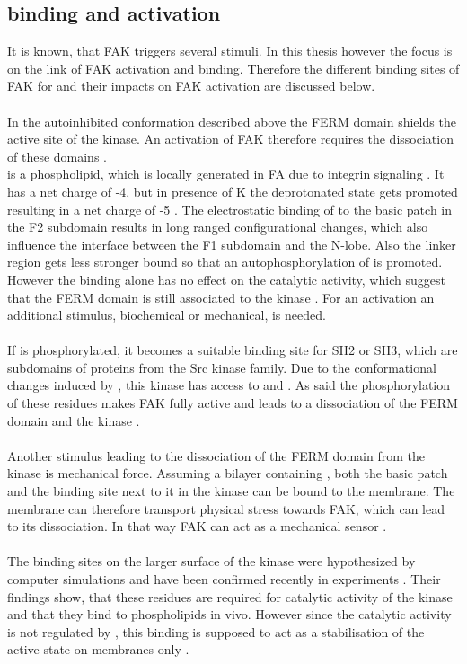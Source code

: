 \subsection{\pip{} binding and activation}
It is known, that FAK triggers several stimuli. In this thesis however the focus is on the link of FAK activation and \pip{} binding. Therefore the different binding sites of FAK for \pip{} and their impacts on FAK activation are discussed below.\\
\\
In the autoinhibited conformation described above the FERM domain shields the active site of the kinase. An activation of FAK therefore requires the dissociation of these domains \autocite{structFAK}.\\
\pip{} is a phospholipid, which is locally generated in FA due to integrin signaling \autocite{CITATION34}. It has a net charge of -4, but in presence of K the deprotonated state gets promoted resulting in a net charge of -5 \autocite{pip2_minus5}. The electrostatic binding of \pip{} to the basic patch in the F2 subdomain results in long ranged configurational changes, which also influence the interface between the F1 subdomain and the N-lobe. Also the linker region gets less stronger bound so that an autophosphorylation of  is promoted. However the \pip{} binding alone has no effect on the catalytic activity, which suggest that the FERM domain is still associated to the kinase \autocites{pap001}{pap003}. For an activation an additional stimulus, biochemical or mechanical, is needed.\\
\\
If  is phosphorylated, it becomes a suitable binding site for SH2 or SH3, which are subdomains of proteins from the Src kinase family. Due to the conformational changes induced by \pip{}, this kinase has access to  and . As said the phosphorylation of these residues makes FAK fully active and leads to a dissociation of the FERM domain and the kinase \autocite{pap001}.\\
\\
Another stimulus leading to the dissociation of the FERM domain from the kinase is mechanical force. Assuming a bilayer containing \pip{}, both the basic patch and the \pip{} binding site next to it in the kinase can be bound to the membrane. The membrane can therefore transport physical stress towards FAK, which can lead to its dissociation. In that way FAK can act as a mechanical sensor \autocite{pap004}.\\
\\
The binding sites on the larger surface of the kinase were hypothesized by computer simulations \autocite{pap002} and have been confirmed recently in experiments \autocite{pap002Exp}. Their findings show, that these residues are required for catalytic activity of the kinase and that they bind to phospholipids in vivo. However since the catalytic activity is not regulated by \pip{}, this binding is supposed to act as a stabilisation of the active state on membranes only \autocite{pap002Exp}.
